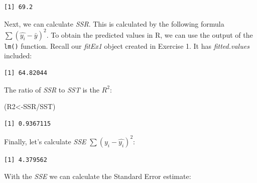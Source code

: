 \documentclass[
  letterpaper,
  DIV=11,
  numbers=noendperiod]{scrreprt}
\newenvironment{Shaded}{\begin{snugshade}}{\end{snugshade}}
\newcommand{\DecValTok}[1]{\textcolor[rgb]{0.68,0.00,0.00}{#1}}
\newcommand{\FunctionTok}[1]{\textcolor[rgb]{0.28,0.35,0.67}{#1}}
\newcommand{\NormalTok}[1]{\textcolor[rgb]{0.00,0.23,0.31}{#1}}
\newcommand{\OtherTok}[1]{\textcolor[rgb]{0.00,0.23,0.31}{#1}}
\newcommand{\SpecialCharTok}[1]{\textcolor[rgb]{0.37,0.37,0.37}{#1}}
\begin{document}
\begin{verbatim}
[1] 69.2
\end{verbatim}

Next, we can calculate \emph{SSR}. This is calculated by the following
formula \(\sum{(\hat{y_{i}}-\bar{y})^2}\). To obtain the predicted
values in R, we can use the output of the \texttt{lm()} function. Recall
our \emph{fitEx1} object created in Exercise 1. It has
\emph{fitted.values} included:

\begin{Shaded}
\end{Shaded}

\begin{verbatim}
[1] 64.82044
\end{verbatim}

The ratio of \emph{SSR} to \emph{SST} is the \(R^2\):

\begin{Shaded}
\begin{Highlighting}[numbers=left,,]
\NormalTok{(R2}\OtherTok{\textless{}{-}}\NormalTok{SSR}\SpecialCharTok{/}\NormalTok{SST)}
\end{Highlighting}
\end{Shaded}

\begin{verbatim}
[1] 0.9367115
\end{verbatim}

Finally, let's calculate \emph{SSE} \(\sum{(y_{i}-\hat{y_{i}})^2}\):

\begin{Shaded}
\end{Shaded}

\begin{verbatim}
[1] 4.379562
\end{verbatim}

With the \emph{SSE} we can calculate the Standard Error estimate:
\end{document}
